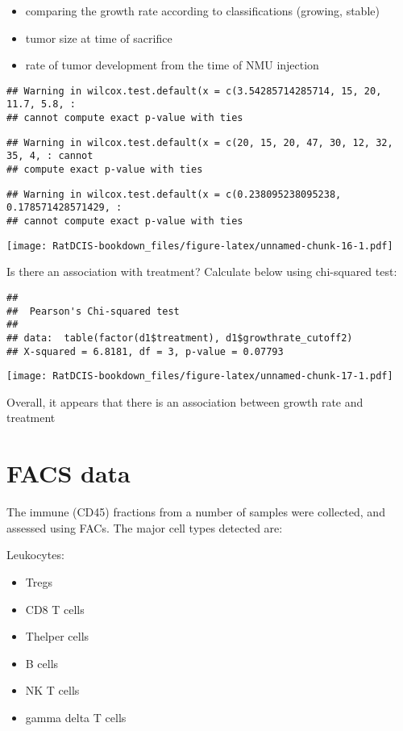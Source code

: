 \documentclass[
]{book}
\providecommand{\tightlist}{%
  \setlength{\itemsep}{0pt}\setlength{\parskip}{0pt}}
\begin{document}
\begin{itemize}
\tightlist
\item
  comparing the growth rate according to classifications (growing, stable)
\item
  tumor size at time of sacrifice
\item
  rate of tumor development from the time of NMU injection
\end{itemize}

\begin{verbatim}
## Warning in wilcox.test.default(x = c(3.54285714285714, 15, 20, 11.7, 5.8, :
## cannot compute exact p-value with ties
\end{verbatim}

\begin{verbatim}
## Warning in wilcox.test.default(x = c(20, 15, 20, 47, 30, 12, 32, 35, 4, : cannot
## compute exact p-value with ties
\end{verbatim}

\begin{verbatim}
## Warning in wilcox.test.default(x = c(0.238095238095238, 0.178571428571429, :
## cannot compute exact p-value with ties
\end{verbatim}

\texttt{[image: RatDCIS-bookdown\_files/figure-latex/unnamed-chunk-16-1.pdf]}

Is there an association with treatment? Calculate below using chi-squared test:

\begin{verbatim}
## 
##  Pearson's Chi-squared test
## 
## data:  table(factor(d1$treatment), d1$growthrate_cutoff2)
## X-squared = 6.8181, df = 3, p-value = 0.07793
\end{verbatim}

\texttt{[image: RatDCIS-bookdown\_files/figure-latex/unnamed-chunk-17-1.pdf]}

Overall, it appears that there is an association between growth rate and treatment

\hypertarget{facs-data}{%
\section{FACS data}\label{facs-data}}

The immune (CD45) fractions from a number of samples were collected, and assessed using FACs. The major cell types detected are:

Leukocytes:

\begin{itemize}
\tightlist
\item
  Tregs
\item
  CD8 T cells
\item
  Thelper cells
\item
  B cells
\item
  NK T cells
\item
  gamma delta T cells
\end{itemize}
\end{document}
